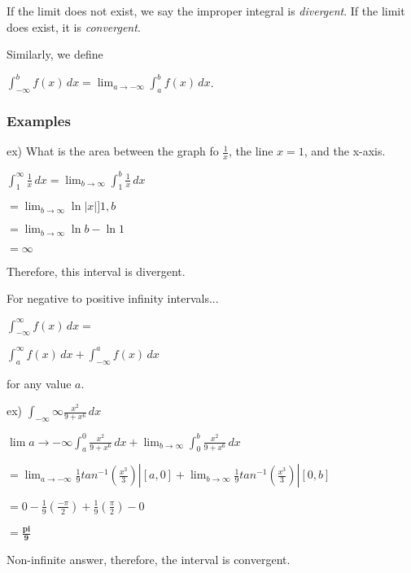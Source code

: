 \documentclass{article}
\begin{document}
If the limit does not exist, we say the improper integral is \textit{divergent}. If the limit does exist, it is \textit{convergent}.

Similarly, we define

\begin{center}
    $\int_{-\infty}^{b} f(x) \,dx = \lim_{a\to-\infty} \int_{a}^{b} f(x) \,dx$.
\end{center}

\subsubsection{Examples}

ex) What is the area between the graph fo $\frac{1}{x}$, the line $x=1$, and the x-axis.

\begin{center}
    $\int_{1}^{\infty} \frac{1}{x} \,dx = \lim_{b\to\infty} \int_{1}^{b} \frac{1}{x} \,dx$
    
    $=\lim_{b\to\infty} \ln{|x|} ] 1,b$
    
    $=\lim_{b\to\infty} \ln{b}-\ln{1}$
    
    $=\infty$
\end{center}

Therefore, this interval is divergent.

For negative to positive infinity intervals...

\begin{center}
    $\int_{-\infty}^{\infty} f(x) \,dx = $
    
    $\int_{a}^{\infty} f(x) \,dx + \int_{-\infty}^{a} f(x) \,dx$
\end{center}

for any value $a$.

ex) $\int_{-\infty}{\infty} \frac{x^2}{9+x^6} \,dx$

\begin{center}
    $\lim{a\to-\infty} \int_{a}^{0} \frac{x^2}{9+x^6} \,dx + \lim_{b\to\infty} \int_{0}^{b} \frac{x^2}{9+x^6} \,dx$
    
    $=\lim_{a\to-\infty} \frac{1}{9} tan^{-1}(\frac{x^3}{3})|[a,0] +\lim_{b\to\infty} \frac{1}{9} tan^{-1}(\frac{x^3}{3})|[0,b] $
    
    $=0-\frac{1}{9}(\frac{-\pi}{2}) + \frac{1}{9}(\frac{\pi}{2}) - 0$
    
    $=\mathbf{\frac{pi}{9}}$
\end{center}

Non-infinite answer, therefore, the interval is convergent.
\end{document}
